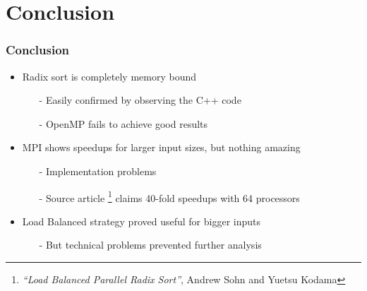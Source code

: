 \section{Conclusion}

\begin{frame}
	\frametitle{Conclusion}

\begin{itemize}\itemsep=10pt
		\item Radix sort is completely memory bound
		\begin{itemize}
			\item[-] Easily confirmed by observing the C++ code
			\item[-] OpenMP fails to achieve good results
		\end{itemize}


		\item MPI shows speedups for larger input sizes, but nothing amazing
		\begin{itemize}
			\item[-] Implementation problems
			\item[-] Source article \footnote{\emph{``Load Balanced Parallel Radix Sort''}, Andrew Sohn and Yuetsu Kodama} claims 40-fold speedups with 64 processors
		\end{itemize}

	\item Load Balanced strategy proved useful for bigger inputs
		\begin{itemize}
			\item[-] But technical problems prevented further analysis
		\end{itemize}

	\end{itemize}

\end{frame}
